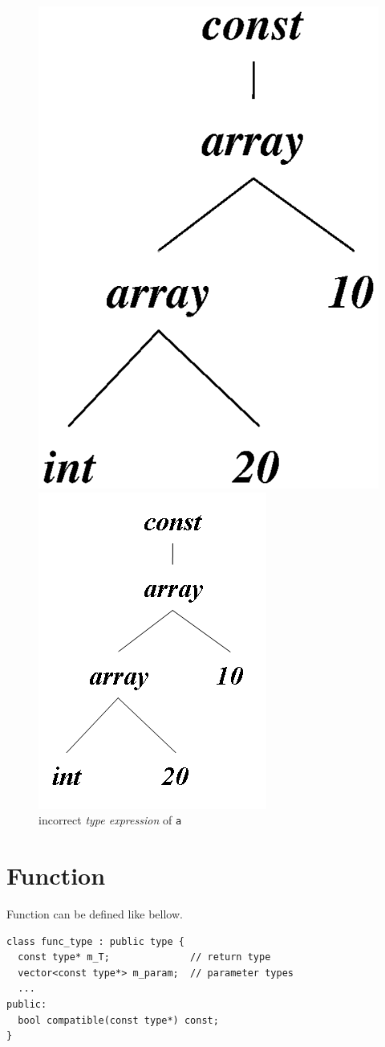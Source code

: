 \begin{figure}[htbp]
\begin{center}
\begin{latexonly}
\includegraphics[width=0.4\linewidth,height=0.5\linewidth]{incorrect_array.eps}
\end{latexonly}
\begin{htmlonly}
\includegraphics{incorrect_array.png}
\end{htmlonly}
\caption{incorrect {\em type expression} of {\tt{a}}}
\label{type008}
\end{center}
\end{figure}

\section{Function}

Function can be defined like bellow.
\begin{verbatim}
class func_type : public type {
  const type* m_T;              // return type
  vector<const type*> m_param;  // parameter types
  ...
public:
  bool compatible(const type*) const;
}
\end{verbatim}

